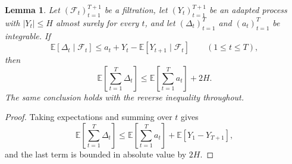 \documentclass[12pt]{article}
\newtheorem{lemma}[theorem]{Lemma}
\theoremstyle{definition}
\newcommand{\E}{\mathbb{E}}
\newcommand{\1}{\mathbf{1}}
\newcommand{\cF}{\mathcal{F}}
\begin{document}
\begin{lemma}
\label{lem:aggregation}
Let $(\cF_t)_{t=1}^{T+1}$ be a filtration, let $(Y_t)_{t=1}^{T+1}$ be an adapted
process with $|Y_t|\le H$ almost surely for every $t$, and let
$(\Delta_t)_{t=1}^T$ and $(a_t)_{t=1}^T$ be integrable. If
\[
\E[\Delta_t\mid \cF_t]
\le
a_t + Y_t - \E[Y_{t+1}\mid \cF_t]
\qquad (1\le t\le T),
\]
then
\[
\E\left[\sum_{t=1}^T \Delta_t\right]
\le
\E\left[\sum_{t=1}^T a_t\right] + 2H.
\]
The same conclusion holds with the reverse inequality throughout.
\end{lemma}

\begin{proof}
Taking expectations and summing over $t$ gives
\[
\E\left[\sum_{t=1}^T \Delta_t\right]
\le
\E\left[\sum_{t=1}^T a_t\right]
+
\E[Y_1-Y_{T+1}],
\]
and the last term is bounded in absolute value by $2H$.
\end{proof}
\end{document}
